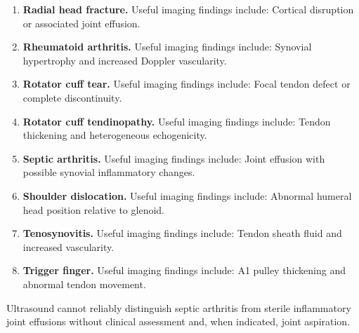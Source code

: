 \begin{enumerate}[leftmargin=*,itemsep=0.45em,topsep=0.4em]
\item \textbf{Radial head fracture.} Useful imaging findings include: Cortical disruption or associated joint effusion.
\item \textbf{Rheumatoid arthritis.} Useful imaging findings include: Synovial hypertrophy and increased Doppler vascularity.
\item \textbf{Rotator cuff tear.} Useful imaging findings include: Focal tendon defect or complete discontinuity.
\item \textbf{Rotator cuff tendinopathy.} Useful imaging findings include: Tendon thickening and heterogeneous echogenicity.
\item \textbf{Septic arthritis.} Useful imaging findings include: Joint effusion with possible synovial inflammatory changes.
\item \textbf{Shoulder dislocation.} Useful imaging findings include: Abnormal humeral head position relative to glenoid.
\item \textbf{Tenosynovitis.} Useful imaging findings include: Tendon sheath fluid and increased vascularity.
\item \textbf{Trigger finger.} Useful imaging findings include: A1 pulley thickening and abnormal tendon movement.
\end{enumerate}
Ultrasound cannot reliably distinguish septic arthritis from sterile inflammatory joint effusions without clinical assessment and, when indicated, joint aspiration.

